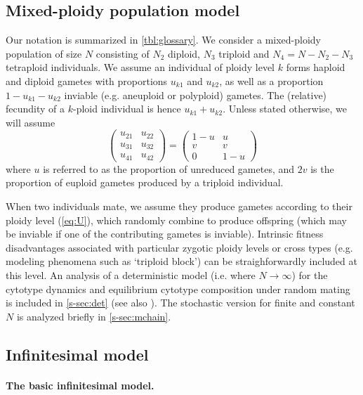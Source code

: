 \documentclass[12pt,a4paper]{article}
\begin{document}
\subsection*{Mixed-ploidy population model}

Our notation is summarized in \cref{tbl:glossary}.
We consider a mixed-ploidy population of size $N$ consisting of $N_2$ diploid,
$N_3$ triploid and $N_4=N-N_2-N_3$ tetraploid individuals.
We assume an individual of ploidy level $k$ forms haploid and diploid gametes
with proportions $u_{k1}$ and $u_{k2}$, as well as a proportion
$1-u_{k1}-u_{k2}$ inviable (e.g. aneuploid or polyploid) gametes.
The (relative) fecundity of a $k$-ploid individual is hence $u_{k1} + u_{k2}$.
Unless stated otherwise, we will assume 
\begin{equation}
    \begin{pmatrix} 
    u_{21} & u_{22} \\ 
    u_{31} & u_{32} \\ 
    u_{41} & u_{42} 
    \end{pmatrix} =
    \begin{pmatrix} 
    1-u & u \\
    v & v \\
    0 & 1-u
    \end{pmatrix} \label{eq:U}
\end{equation}
where $u$ is referred to as the proportion of unreduced gametes, and $2v$ is
the proportion of euploid gametes produced by a triploid individual.

When two individuals mate, we assume they produce gametes according to their
ploidy level (\cref{eq:U}), which randomly combine to produce offspring (which
may be inviable if one of the contributing gametes is inviable).
Intrinsic fitness disadvantages associated with particular zygotic ploidy
levels or cross types (e.g. modeling phenomena such as `triploid block') can be
straighforwardly included at this level.
An analysis of a deterministic model (i.e. where $N \rightarrow \infty$) for
the cytotype dynamics and equilibrium cytotype composition under random mating
is included in \cref{s-sec:det} (see also \cite{felber1997,kauai2024}).
The stochastic version for finite and constant $N$ is analyzed briefly in
\cref{s-sec:mchain}.

\subsection*{Infinitesimal model}

\paragraph*{The basic infinitesimal model.}
\end{document}
